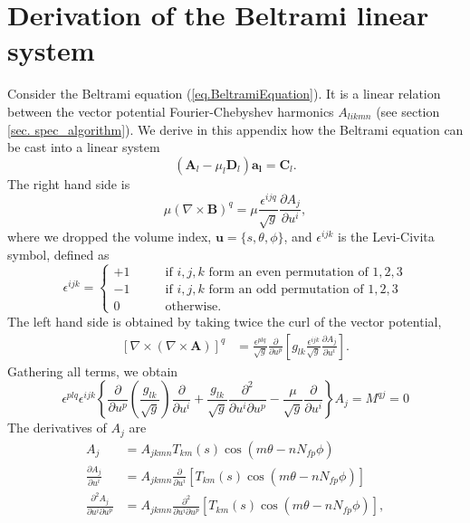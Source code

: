 \chapter{Derivation of the Beltrami linear system} \label{app. beltrami eq coef derivation}
Consider the Beltrami equation (\ref{eq.BeltramiEquation}). It is a linear relation between the vector potential Fourier-Chebyshev harmonics $A_{likmn}$ (see section \ref{sec. spec_algorithm}). We derive in this appendix how the Beltrami equation can be cast into a linear system
\begin{equation}
	\left(\mathbf{A}_l-\mu_l\mathbf{D}_l\right)\mathbf{a_l} = \mathbf{C}_l.
\end{equation}
The right hand side is
\begin{equation}
	\mu(\nabla\times\mathbf{B})^q = \mu\frac{\epsilon^{ijq}}{\sqrt{g}}\frac{\partial A_j}{\partial u^i},
\end{equation}
where we dropped the volume index, $\mathbf{u}=\{s,\theta,\phi\}$, and $\epsilon^{ijk}$ is the Levi-Civita symbol, defined as
\begin{equation}
	\epsilon^{ijk} = \begin{cases}
		+1 \qquad& \text{if $i,j,k$ form an even permutation of $1,2,3$}\\
		-1 \qquad& \text{if $i,j,k$ form an odd permutation of $1,2,3$}\\
		0  \qquad& \text{otherwise}.
	\end{cases}
\end{equation}
The left hand side is obtained by taking twice the curl of the vector potential,
\begin{align}
	\left[\nabla\times(\nabla\times\mathbf{A})\right]^q &= \frac{\epsilon^{plq}}{\sqrt{g}}\frac{\partial}{\partial u^p}\left[g_{lk}\frac{\epsilon^{ijk}}{\sqrt{g}}\frac{\partial A_j}{\partial u^i}\right].
\end{align}
Gathering all terms, we obtain
\begin{equation}
	\epsilon^{plq}\epsilon^{ijk}\left\{\frac{\partial}{\partial u^p}\left(\frac{g_{lk}}{\sqrt{g}}\right)\frac{\partial}{\partial u^i}+\frac{g_{lk}}{\sqrt{g}}\frac{\partial^2}{\partial u^i\partial u^p} - \frac{\mu}{\sqrt{g}}\frac{\partial}{\partial u^i} \right\}A_j=M^{qj}=0
\end{equation}
The derivatives of $A_j$ are
\begin{align}
	A_j &= A_{jkmn} T_{km}(s)\cos(m\theta-nN_{fp}\phi)\\
	\frac{\partial A_j}{\partial u^i} &=  A_{jkmn} \frac{\partial}{\partial u^i}\left[T_{km}(s)\cos(m\theta-nN_{fp}\phi)\right]\\
	\frac{\partial^2 A_j}{\partial u^i\partial u^p} &=  A_{jkmn} \frac{\partial^2}{\partial u^i\partial u^p}\left[T_{km}(s)\cos(m\theta-nN_{fp}\phi)\right],
\end{align}
